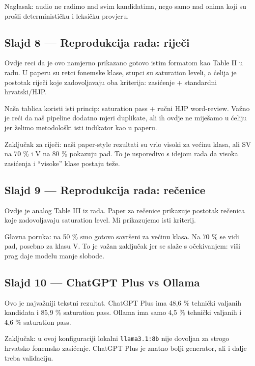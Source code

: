 \documentclass[
]{article}
\begin{document}
Naglasak: audio ne radimo nad svim kandidatima, nego samo nad onima koji
su prošli determinističku i leksičku provjeru.

\subsection{Slajd 8 --- Reprodukcija rada:
riječi}\label{slajd-8-reprodukcija-rada-rijeux10di}

Ovdje reci da je ovo namjerno prikazano gotovo istim formatom kao Table
II u radu. U paperu su retci fonemske klase, stupci su saturation
leveli, a ćelija je postotak riječi koje zadovoljavaju oba kriterija:
zasićenje + standardni hrvatski/HJP.

Naša tablica koristi isti princip: saturation pass + ručni HJP
word-review. Važno je reći da naš pipeline dodatno mjeri duplikate, ali
ih ovdje ne miješamo u ćeliju jer želimo metodološki isti indikator kao
u paperu.

Zaključak za riječi: naši paper-style rezultati su vrlo visoki za većinu
klasa, ali SV na 70 \% i V na 80 \% pokazuju pad. To je usporedivo s
idejom rada da visoka zasićenja i ``visoke'' klase postaju teže.

\subsection{Slajd 9 --- Reprodukcija rada:
rečenice}\label{slajd-9-reprodukcija-rada-reux10denice}

Ovdje je analog Table III iz rada. Paper za rečenice prikazuje postotak
rečenica koje zadovoljavaju saturation level. Mi prikazujemo isti
kriterij.

Glavna poruka: na 50 \% smo gotovo savršeni za većinu klasa. Na 70 \% se
vidi pad, posebno za klasu V. To je važan zaključak jer se slaže s
očekivanjem: viši prag daje modelu manje slobode.

\subsection{Slajd 10 --- ChatGPT Plus vs
Ollama}\label{slajd-10-chatgpt-plus-vs-ollama}

Ovo je najvažniji tekstni rezultat. ChatGPT Plus ima 48,6 \% tehnički
valjanih kandidata i 85,9 \% saturation pass. Ollama ima samo 4,5 \%
tehnički valjanih i 4,6 \% saturation pass.

Zaključak: u ovoj konfiguraciji lokalni \texttt{llama3.1:8b} nije
dovoljan za strogo hrvatsko fonemsko zasićenje. ChatGPT Plus je znatno
bolji generator, ali i dalje treba validaciju.
\end{document}
